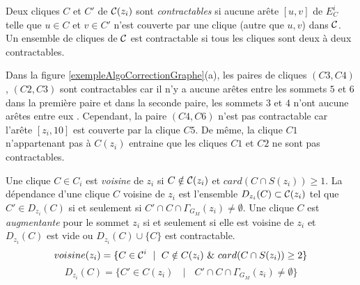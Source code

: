 \begin{definition}
Deux cliques $C$ et $C'$ de ${\cal C}(z_i)$ sont {\em contractables} si aucune ar\^ete $[u,v]$ de $E_C^i$ telle que $u \in C$ et $v \in C'$ n'est couverte par une clique (autre que ${u,v}$) dans $\cal C$.
Un ensemble de cliques de $\cal C$ est contractable si tous les cliques sont deux \`a deux contractables.
\end{definition}
Dans la figure \ref{exempleAlgoCorrectionGraphe}(a), les paires de cliques $(C3, C4)$, $(C2, C3)$ sont contractables car il n'y a aucune ar\^etes entre les sommets $5$ et $6$ dans la premi\`ere paire et dans la seconde paire, les sommets $3$ et $4$ n'ont aucune ar\^etes entre eux . 
Cependant, la paire $(C4, C6)$ n'est pas contractable car l'ar\^ete $[z_i,10]$ est couverte par la clique $C5$. De m\^eme, la clique $C1$ n'appartenant pas \`a $C(z_i)$ entraine que les cliques $C1$ et $C2$ ne sont pas contractables.

\begin{definition}
Une clique $C \in C_i$ est {\em voisine} de $z_i$ si $C \notin {\cal C}(z_i)$ et $card(C \cap S(z_i)) \ge 1$.
La d\'ependance d'une clique $C$ voisine de $z_i$ est l'ensemble $D_{z_i}(C) \subset {\cal C}(z_i)$ tel que $C' \in D_{z_i}(C)$ si et seulement si  $C' \cap C \cap \Gamma_{G_M}(z_i) \ne \emptyset$.
\newline
Une clique $C$ est {\em augmentante} pour le sommet $z_i$ si et seulement si elle est voisine de $z_i$ et  $D_{z_i}(C)$ est vide  ou $D_{z_i}(C) \cup \{C\}$ est contractable.
\begin{equation}
voisine(z_i) = \{C \in {\cal C}^i \mbox{ } \mid \mbox{ } C \notin C(z_i) \mbox{ } \& \mbox{ } card(C \cap S(z_i)) \ge 2 \} \newline
\end{equation}
\begin{equation}
D_{z_i}(C) = \{ C' \in C(z_i) \mbox{ } \mid  \mbox{ } C' \cap C \cap \Gamma_{G_M}(z_i) \ne \emptyset \}
\end{equation}
\end{definition}


